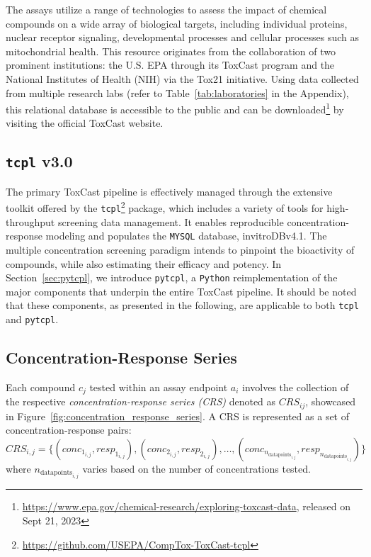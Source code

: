 The assays utilize a range of technologies to assess the impact of chemical compounds on a wide array of biological targets, including individual proteins, nuclear receptor signaling, developmental processes and cellular processes such as mitochondrial health. This resource originates from the collaboration of two prominent institutions: the  U.S. EPA through its ToxCast program and the National Institutes of Health (NIH) via the Tox21 initiative. Using data collected from multiple research labs (refer to Table~\ref{tab:laboratories} in the Appendix), this relational database is accessible to the public and can be downloaded\footnote{\url{https://www.epa.gov/chemical-research/exploring-toxcast-data}, released on Sept 21, 2023} by visiting the official ToxCast website.

\subsection{\texttt{tcpl} v3.0}
The primary ToxCast pipeline is effectively managed through the extensive toolkit offered by the \texttt{tcpl}\footnote{\url{https://github.com/USEPA/CompTox-ToxCast-tcpl}} package, which includes a variety of tools for high-throughput screening data management. It enables reproducible concentration-response modeling and populates the \texttt{MYSQL} database, invitroDBv4.1. The multiple concentration screening paradigm intends to pinpoint the bioactivity of compounds, while also estimating their efficacy and potency. In Section~\ref{sec:pytcpl}, we introduce \texttt{pytcpl}, a \texttt{Python} reimplementation of the major components that underpin the entire ToxCast pipeline. It should be noted that these components, as presented in the following, are applicable to both \texttt{tcpl} and \texttt{pytcpl}.



\subsection{Concentration-Response Series}
Each compound $c_j$ tested within an assay endpoint $a_i$ involves the collection of the respective \emph{concentration-response series (CRS)} denoted as $CRS_{ij}$, showcased in Figure~\ref{fig:concentration_response_series}. A CRS is represented as a set of concentration-response pairs: 
\[ CRS_{i,j} = \{(conc_{1_{i,j}}, resp_{1_{i,j}}), (conc_{2_{i,j}}, resp_{2_{i,j}}), \dots, (conc_{n_{\text{datapoints}_{i,j}}}, resp_{n_{\text{datapoints}_{i,j}}})\} \] where $n_{\text{datapoints}_{i,j}}$ varies based on the number of concentrations tested. 

